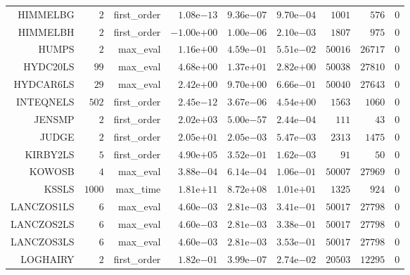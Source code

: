\begin{longtable}{rrrrrrrrr}
HIMMELBG & \(     2\) & first\_order & \( 1.08\)e\(-13\) & \( 9.36\)e\(-07\) & \( 9.70\)e\(-04\) & \(  1001\) & \(   576\) & \(     0\) \\
HIMMELBH & \(     2\) & first\_order & \(-1.00\)e\(+00\) & \( 1.00\)e\(-06\) & \( 2.10\)e\(-03\) & \(  1807\) & \(   975\) & \(     0\) \\
HUMPS & \(     2\) & max\_eval & \( 1.16\)e\(+00\) & \( 4.59\)e\(-01\) & \( 5.51\)e\(-02\) & \( 50016\) & \( 26717\) & \(     0\) \\
HYDC20LS & \(    99\) & max\_eval & \( 4.68\)e\(+00\) & \( 1.37\)e\(+01\) & \( 2.82\)e\(+00\) & \( 50038\) & \( 27810\) & \(     0\) \\
HYDCAR6LS & \(    29\) & max\_eval & \( 2.42\)e\(+00\) & \( 9.70\)e\(+00\) & \( 6.66\)e\(-01\) & \( 50040\) & \( 27643\) & \(     0\) \\
INTEQNELS & \(   502\) & first\_order & \( 2.45\)e\(-12\) & \( 3.67\)e\(-06\) & \( 4.54\)e\(+00\) & \(  1563\) & \(  1060\) & \(     0\) \\
JENSMP & \(     2\) & first\_order & \( 2.02\)e\(+03\) & \( 5.00\)e\(-57\) & \( 2.44\)e\(-04\) & \(   111\) & \(    43\) & \(     0\) \\
JUDGE & \(     2\) & first\_order & \( 2.05\)e\(+01\) & \( 2.05\)e\(-03\) & \( 5.47\)e\(-03\) & \(  2313\) & \(  1475\) & \(     0\) \\
KIRBY2LS & \(     5\) & first\_order & \( 4.90\)e\(+05\) & \( 3.52\)e\(-01\) & \( 1.62\)e\(-03\) & \(    91\) & \(    50\) & \(     0\) \\
KOWOSB & \(     4\) & max\_eval & \( 3.88\)e\(-04\) & \( 6.14\)e\(-04\) & \( 1.06\)e\(-01\) & \( 50007\) & \( 27969\) & \(     0\) \\
KSSLS & \(  1000\) & max\_time & \( 1.81\)e\(+11\) & \( 8.72\)e\(+08\) & \( 1.01\)e\(+01\) & \(  1325\) & \(   924\) & \(     0\) \\
LANCZOS1LS & \(     6\) & max\_eval & \( 4.60\)e\(-03\) & \( 2.81\)e\(-03\) & \( 3.41\)e\(-01\) & \( 50017\) & \( 27798\) & \(     0\) \\
LANCZOS2LS & \(     6\) & max\_eval & \( 4.60\)e\(-03\) & \( 2.81\)e\(-03\) & \( 3.38\)e\(-01\) & \( 50017\) & \( 27798\) & \(     0\) \\
LANCZOS3LS & \(     6\) & max\_eval & \( 4.60\)e\(-03\) & \( 2.81\)e\(-03\) & \( 3.53\)e\(-01\) & \( 50017\) & \( 27798\) & \(     0\) \\
LOGHAIRY & \(     2\) & first\_order & \( 1.82\)e\(-01\) & \( 3.99\)e\(-07\) & \( 2.74\)e\(-02\) & \( 20503\) & \( 12295\) & \(     0\) \\

\end{longtable}
